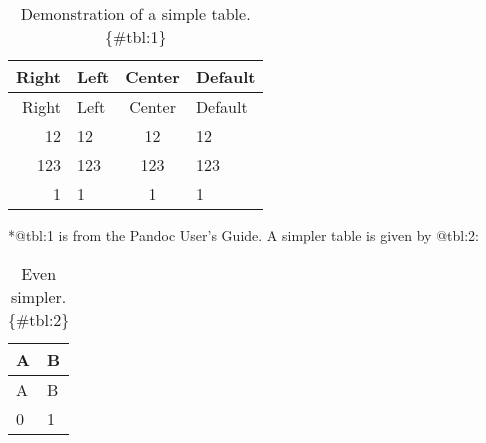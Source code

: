 \begin{longtable}[]{@{}rlcl@{}}
\caption{Demonstration of a simple table. \{\#tbl:1\}}\tabularnewline
\toprule
Right & Left & Center & Default\tabularnewline
\midrule
\endfirsthead
\toprule
Right & Left & Center & Default\tabularnewline
\midrule
\endhead
12 & 12 & 12 & 12\tabularnewline
123 & 123 & 123 & 123\tabularnewline
1 & 1 & 1 & 1\tabularnewline
\bottomrule
\end{longtable}

*@tbl:1 is from the Pandoc User's Guide. A simpler table is given by
@tbl:2:

\begin{longtable}[]{@{}ll@{}}
\caption{Even simpler. \{\#tbl:2\}}\tabularnewline
\toprule
A & B\tabularnewline
\midrule
\endfirsthead
\toprule
A & B\tabularnewline
\midrule
\endhead
0 & 1\tabularnewline
\bottomrule
\end{longtable}
